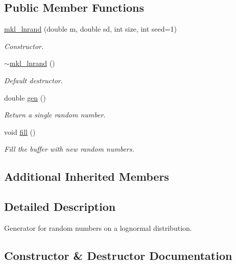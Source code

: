 \subsection*{Public Member Functions}
\begin{DoxyCompactItemize}
\item 
\hyperlink{classmkl__lnrand_a157affc091d0a00ab19edaeae727968d}{mkl\+\_\+lnrand} (double m, double sd, int size, int seed=1)
\begin{DoxyCompactList}\small\item\em Constructor. \end{DoxyCompactList}\item 
\hyperlink{classmkl__lnrand_a7d5bb29ce8f39e37d7f56049c8c381b6}{$\sim$mkl\+\_\+lnrand} ()
\begin{DoxyCompactList}\small\item\em Default destructor. \end{DoxyCompactList}\item 
double \hyperlink{classmkl__lnrand_a30bf120ea39eb0fb5e99a9eecf5f8dbe}{gen} ()
\begin{DoxyCompactList}\small\item\em Return a single random number. \end{DoxyCompactList}\item 
void \hyperlink{classmkl__lnrand_a299d1067f9140cf9b0030e9d86b0e4f7}{fill} ()
\begin{DoxyCompactList}\small\item\em Fill the buffer with new random numbers. \end{DoxyCompactList}\end{DoxyCompactItemize}
\subsection*{Additional Inherited Members}


\subsection{Detailed Description}
Generator for random numbers on a lognormal distribution. 

\subsection{Constructor \& Destructor Documentation}
